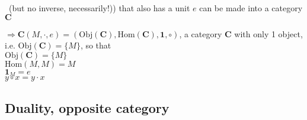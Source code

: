 \documentclass[10pt]{amsart}
\begin{document}
\begin{multicols*}{2}
\begin{itemize}
	\quad \, (but no inverse, necessarily!)) that also has a unit $e$ can be made into a category $\mathbf{C}$ 
	
	$\Longrightarrow \mathbf{C}(M,\cdot ,e) = (\text{Obj}(\mathbf{C}), \text{Hom}(\mathbf{C}), \mathbf{1}, \circ)$, a category $\mathbf{C}$ with only 1 object, i.e. $\text{Obj}(\mathbf{C}) = \lbrace M \rbrace$, so that \\
	$\text{Obj}(\mathbf{C}) = \lbrace M \rbrace$ \\
	$\text{Hom}(M,M) = M$ \\
	$\mathbf{1}_M = e$ \\
	$y \circ x = y \cdot x$
\end{itemize}

\subsection{Duality, opposite category}


\end{multicols*}
\end{document}
